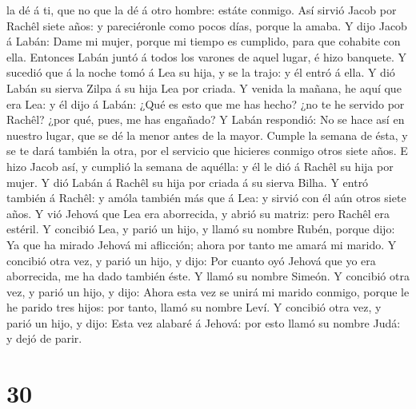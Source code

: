 la dé á ti, que no que la dé á otro hombre: estáte conmigo.
 Así sirvió Jacob por Rachêl siete años: y pareciéronle
como pocos días, porque la amaba.  Y dijo Jacob á Labán:
Dame mi mujer, porque mi tiempo es cumplido, para que cohabite con ella.
 Entonces Labán juntó á todos los varones de aquel lugar, é
hizo banquete.  Y sucedió que á la noche tomó á Lea su
hija, y se la trajo: y él entró á ella.  Y dió Labán su
sierva Zilpa á su hija Lea por criada.  Y venida la mañana,
he aquí que era Lea: y él dijo á Labán: ¿Qué es esto que me has hecho?
¿no te he servido por Rachêl? ¿por qué, pues, me has engañado?
 Y Labán respondió: No se hace así en nuestro lugar, que se
dé la menor antes de la mayor.  Cumple la semana de ésta, y
se te dará también la otra, por el servicio que hicieres conmigo otros
siete años.  E hizo Jacob así, y cumplió la semana de
aquélla: y él le dió á Rachêl su hija por mujer.  Y dió
Labán á Rachêl su hija por criada á su sierva Bilha.  Y
entró también á Rachêl: y amóla también más que á Lea: y sirvió con él
aún otros siete años.  Y vió Jehová que Lea era aborrecida,
y abrió su matriz: pero Rachêl era estéril.  Y concibió
Lea, y parió un hijo, y llamó su nombre Rubén, porque dijo: Ya que ha
mirado Jehová mi aflicción; ahora por tanto me amará mi marido.
 Y concibió otra vez, y parió un hijo, y dijo: Por cuanto
oyó Jehová que yo era aborrecida, me ha dado también éste. Y llamó su
nombre Simeón.  Y concibió otra vez, y parió un hijo, y
dijo: Ahora esta vez se unirá mi marido conmigo, porque le he parido
tres hijos: por tanto, llamó su nombre Leví.  Y concibió
otra vez, y parió un hijo, y dijo: Esta vez alabaré á Jehová: por esto
llamó su nombre Judá: y dejó de parir.

\hypertarget{section-29}{%
\section{30}\label{section-29}}

